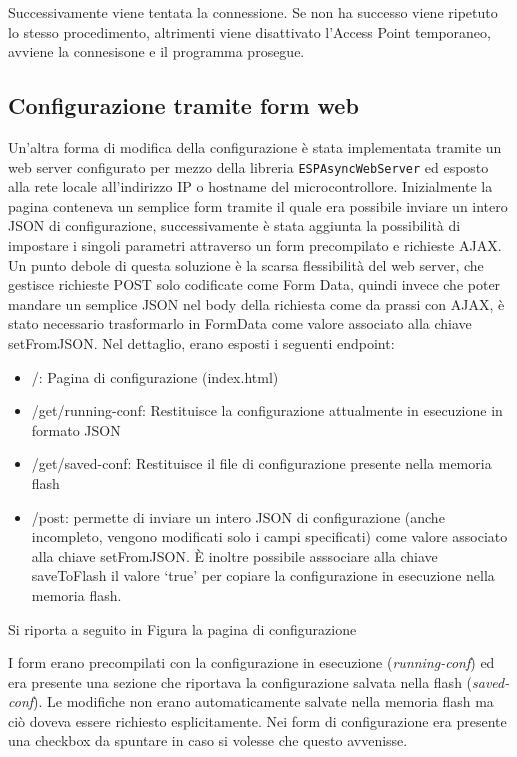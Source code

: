 \documentclass[12pt,a4paper]{report}
\begin{document}

Successivamente viene tentata la connessione. Se non ha successo viene ripetuto lo stesso procedimento, altrimenti viene disattivato
l'Access Point temporaneo, avviene la connesisone e il programma prosegue.

\subsection{Configurazione tramite form web}
Un'altra forma di modifica della configurazione è stata implementata tramite un web server configurato per mezzo della libreria
\texttt{ESPAsyncWebServer} ed esposto alla rete locale all'indirizzo IP o hostname del microcontrollore.
 Inizialmente la pagina conteneva un semplice form tramite il quale era possibile inviare un intero JSON
di configurazione, successivamente è stata aggiunta la possibilità di impostare i singoli parametri attraverso un form precompilato
e richieste AJAX. Un punto debole di questa soluzione è la scarsa flessibilità del web server, che gestisce richieste POST solo codificate
come Form Data, quindi invece che poter mandare un semplice JSON nel body della richiesta come da prassi con AJAX, è stato necessario
trasformarlo in FormData come valore associato alla chiave setFromJSON.
Nel dettaglio, erano esposti i seguenti endpoint:
\begin{itemize}
  \item /: Pagina di configurazione (index.html)
  \item /get/running-conf: Restituisce la configurazione attualmente in esecuzione in formato JSON
  \item /get/saved-conf: Restituisce il file di configurazione presente nella memoria flash
  \item /post: permette di inviare un intero JSON di configurazione (anche incompleto, vengono modificati solo i campi specificati) come
        valore associato alla chiave setFromJSON. È inoltre possibile asssociare alla chiave saveToFlash il valore `true' per copiare
        la configurazione in esecuzione nella memoria flash.
\end{itemize}

Si riporta a seguito in Figura la pagina di configurazione


I form erano precompilati con la configurazione in esecuzione (\emph{running-conf}) ed era presente una sezione che riportava la
configurazione salvata nella flash (\emph{saved-conf}).
Le modifiche non erano automaticamente salvate nella memoria flash ma ciò doveva essere richiesto esplicitamente. Nei form di configurazione
era presente una checkbox da spuntare in caso si volesse che questo avvenisse.
\end{document}
